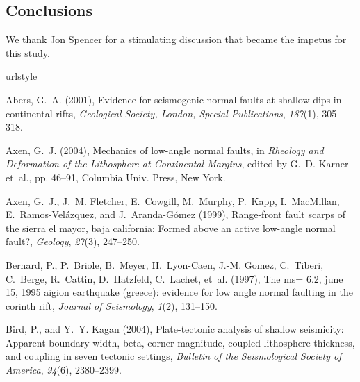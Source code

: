 \documentclass[twocolumn,grl]{AGUTeX}
\begin{document}
\begin{article}
\section{Conclusions}

\begin{acknowledgements}
  We thank Jon Spencer for a stimulating discussion that became the
  impetus for this study.
\end{acknowledgements}

\begin{thebibliography}{25}
\providecommand{\natexlab}[1]{#1}
\expandafter\ifx\csname urlstyle\endcsname\relax
  \providecommand{\doi}[1]{doi:\discretionary{}{}{}#1}\else
  \providecommand{\doi}{doi:\discretionary{}{}{}\begingroup
  \urlstyle{rm}\Url}\fi

Abers, G.~A. (2001), Evidence for seismogenic normal faults at shallow dips in
  continental rifts, \textit{Geological Society, London, Special Publications},
  \textit{187}(1), 305--318.

Axen, G.~J. (2004), Mechanics of low-angle normal faults, in \textit{Rheology
  and Deformation of the Lithosphere at Continental Margins}, edited by G.~D.
  Karner et~al., pp. 46--91, Columbia Univ. Press, New York.

Axen, G.~J., J.~M. Fletcher, E.~Cowgill, M.~Murphy, P.~Kapp, I.~MacMillan,
  E.~Ramos-Vel{\'a}zquez, and J.~Aranda-G{\'o}mez (1999), Range-front fault
  scarps of the sierra el mayor, baja california: Formed above an active
  low-angle normal fault?, \textit{Geology}, \textit{27}(3), 247--250.

Bernard, P., P.~Briole, B.~Meyer, H.~Lyon-Caen, J.-M. Gomez, C.~Tiberi,
  C.~Berge, R.~Cattin, D.~Hatzfeld, C.~Lachet, et~al. (1997), The ms= 6.2, june
  15, 1995 aigion earthquake (greece): evidence for low angle normal faulting
  in the corinth rift, \textit{Journal of Seismology}, \textit{1}(2), 131--150.

Bird, P., and Y.~Y. Kagan (2004), Plate-tectonic analysis of shallow
  seismicity: Apparent boundary width, beta, corner magnitude, coupled
  lithosphere thickness, and coupling in seven tectonic settings,
  \textit{Bulletin of the Seismological Society of America}, \textit{94}(6),
  2380--2399.


\end{thebibliography}
\end{article}
\end{document}
